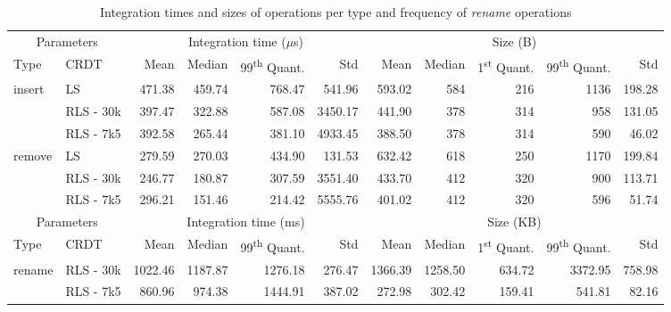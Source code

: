 \documentclass[10pt,journal,compsoc]{IEEEtran}
\let\MYoriglatexcaption\caption
\renewcommand{\caption}[2][\relax]{\MYoriglatexcaption[#2]{#2}}
\newcommand{\trm}[1]{\mathit{#1}}
\begin{document}
\begin{table}[!ht]
    \centering
    \label{tab:impact-frequency}
    \begin{tabular}{llrrrrrrrrr}
        \toprule
        \multicolumn{2}{c}{Parameters} & \multicolumn{4}{c}{Integration time ($\trm{\mu}$s)}  & \multicolumn{5}{c}{Size (B)} \\
        \cmidrule(lr){1-2} \cmidrule(lr){3-6} \cmidrule(lr){7-11}
        Type & CRDT &   Mean &   Median & 99\textsuperscript{th} Quant. &    Std &   Mean &   Median & 1\textsuperscript{st} Quant. & 99\textsuperscript{th} Quant. &    Std \\
        \midrule
        insert & LS &     471.38 &     459.74 &     768.47 &    541.96 &     593.02 &      584 &     216 &    1136 &    198.28 \\
        & RLS - 30k &     397.47 &     322.88 &     587.08 &   3450.17 &     441.90 &      378 &     314 &     958 &    131.05 \\
        & RLS - 7k5 &     392.58 &     265.44 &     381.10 &   4933.45 &     388.50 &      378 &     314 &     590 &     46.02 \\
        \cmidrule(lr){1-11}
        remove & LS &     279.59 &     270.03 &     434.90 &    131.53 &     632.42 &      618 &     250 &    1170 &    199.84 \\
        & RLS - 30k &     246.77 &     180.87 &     307.59 &   3551.40 &     433.70 &      412 &     320 &     900 &    113.71 \\
        & RLS - 7k5 &     296.21 &     151.46 &     214.42 &   5555.76 &     401.02 &      412 &     320 &     596 &     51.74 \\
        \midrule
        \multicolumn{2}{c}{Parameters} & \multicolumn{4}{c}{Integration time (ms)}  & \multicolumn{5}{c}{Size (KB)} \\
        \cmidrule(lr){1-2} \cmidrule(lr){3-6} \cmidrule(lr){7-11}
        Type & CRDT &   Mean &   Median & 99\textsuperscript{th} Quant. &    Std &   Mean &   Median & 1\textsuperscript{st} Quant. & 99\textsuperscript{th} Quant. &    Std \\
        \midrule
        rename & RLS - 30k  & 1022.46 & 1187.87 &    1276.18 & 276.47 & 1366.39 & 1258.50 &     634.72 &    3372.95 & 758.98 \\
        & RLS - 7k5 &  860.96 &  974.38 &    1444.91 & 387.02 &  272.98 &  302.42 &     159.41 &     541.81 &  82.16 \\
        \bottomrule
    \end{tabular}
    \caption{Integration times and sizes of operations per type and frequency of \emph{rename} operations}
\end{table}
\end{document}
